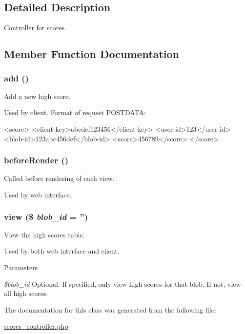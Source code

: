 \subsection{Detailed Description}
Controller for scores. 

\subsection{Member Function Documentation}
\hypertarget{class_scores_controller_a837ba24a1c3095ae67613238d866f79a}{
\subsubsection[{add}]{\setlength{\rightskip}{0pt plus 5cm}add ()}}
\label{class_scores_controller_a837ba24a1c3095ae67613238d866f79a}


Add a new high score. 

Used by client. Format of request POSTDATA: 
\begin{DoxyCode}
 <score>
   <client-key>abcdef123456</client-key>
   <user-id>123</user-id>
   <blob-id>123abc456def</blob-id>
   <score>456789</score>
 </score>
\end{DoxyCode}
 \hypertarget{class_scores_controller_ac89dd29d2229bbc37879d31f95d06e97}{
\subsubsection[{beforeRender}]{\setlength{\rightskip}{0pt plus 5cm}beforeRender ()}}
\label{class_scores_controller_ac89dd29d2229bbc37879d31f95d06e97}


Called before rendering of each view. 

Used by web interface. \hypertarget{class_scores_controller_a82afb1e6c361be60e0ec7e239ea40a93}{
\subsubsection[{view}]{\setlength{\rightskip}{0pt plus 5cm}view (\$ {\em blob\_\-id} = {\ttfamily ''})}}
\label{class_scores_controller_a82afb1e6c361be60e0ec7e239ea40a93}


View the high scores table. 

Used by both web interface and client. 
\begin{DoxyParams}{Parameters}
\item[{\em \$blob\_\-id}]Optional. If specified, only view high scores for that blob. If not, view all high scores. \end{DoxyParams}


The documentation for this class was generated from the following file:\begin{DoxyCompactItemize}
\item 
\hyperlink{scores__controller_8php}{scores\_\-controller.php}\end{DoxyCompactItemize}
